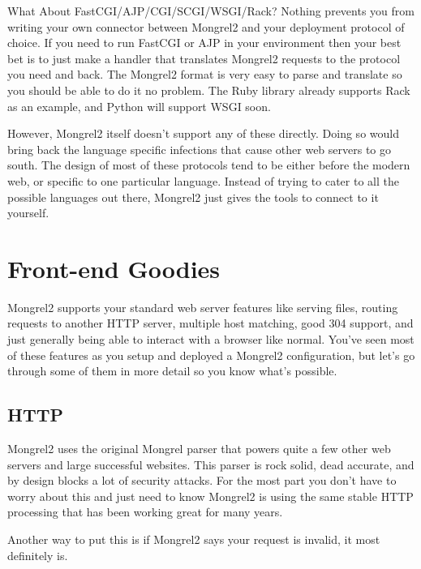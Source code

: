 \begin{aside}{What About FastCGI/AJP/CGI/SCGI/WSGI/Rack?}
Nothing prevents you from writing your own connector between Mongrel2 and your 
deployment protocol of choice.  If you need to run FastCGI or AJP in your environment
then your best bet is to just make a handler that translates Mongrel2 requests
to the protocol you need and back.  The Mongrel2 format is very easy to parse and
translate so you should be able to do it no problem.  The Ruby library already supports
Rack as an example, and Python will support WSGI soon.

However, Mongrel2 itself doesn't support any of these directly.  Doing so would bring
back the language specific infections that cause other web servers to go south.  The 
design of most of these protocols tend to be either before the modern web, or specific
to one particular language.  Instead of trying to cater to all the possible languages
out there, Mongrel2 just gives the tools to connect to it yourself.
\end{aside}


\section{Front-end Goodies}

Mongrel2 supports your standard web server features like serving files, routing requests to 
another HTTP server, multiple host matching, good 304 support, and just generally being able
to interact with a browser like normal.  You've seen most of these features as you setup and
deployed a Mongrel2 configuration, but let's go through some of them in more detail so you
know what's possible.


\subsection{HTTP}

Mongrel2 uses the original Mongrel parser that powers quite a few other web servers and large
successful websites.  This parser is rock solid, dead accurate, and by design blocks a lot of
security attacks.  For the most part you don't have to worry about this and just need to know
Mongrel2 is using the same stable HTTP processing that has been working great for many years.

Another way to put this is if Mongrel2 says your request is invalid, it most definitely is.

